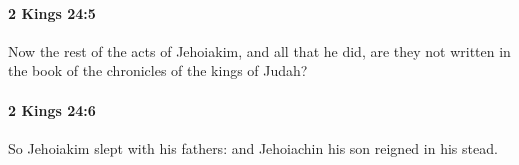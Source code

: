 		\paragraph{2 Kings 24:5} %
			\label{2KINGS-24-5}

			Now the rest of the acts of Jehoiakim, and all that he did, are they not written in the book of the chronicles of the kings of Judah?


		\paragraph{2 Kings 24:6} %
			\label{2KINGS-24-6}

			So Jehoiakim slept with his fathers: and Jehoiachin his son reigned in his stead.


